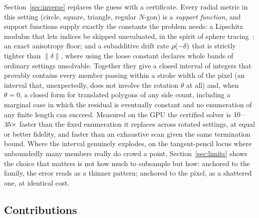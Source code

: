Section~\ref{sec:inverse} replaces the guess with a certificate. Every radial
metric in this setting (circle, square, triangle, regular $N$-gon) is a
\emph{support function}, and support functions supply exactly the constants the
problem needs: a Lipschitz modulus that lets indices be skipped unevaluated, in
the spirit of sphere tracing~\cite{Hart1996Sphere}; an exact anisotropy floor;
and a subadditive drift rate $\rho(-\delta)$ that is strictly tighter than
$\lVert\delta\rVert$, where using the loose constant declares whole bands of
ordinary settings unsolvable. Together they give a closed interval of integers
that provably contains every member passing within a stroke width of the pixel
(an interval that, unexpectedly, does not involve the rotation $\theta$ at
all) and, when $\theta=0$, a closed form for translated polygons of any side
count, including a marginal case in which the residual is eventually constant
and no enumeration of any finite length can succeed. Measured on the GPU the
certified solver is $10$--$35\times$ faster than the fixed
enumeration it replaces across rotated settings, at equal or better fidelity,
and faster than an exhaustive scan given the same termination bound. Where the
interval genuinely explodes, on the tangent-pencil locus where unboundedly
many members really do crowd a point, Section~\ref{sec:limits} shows the
choice that matters is not how much to subsample but how: anchored to the
family, the error reads as a thinner pattern; anchored to the pixel, as a
shattered one, at identical cost.

\subsection{Contributions}

